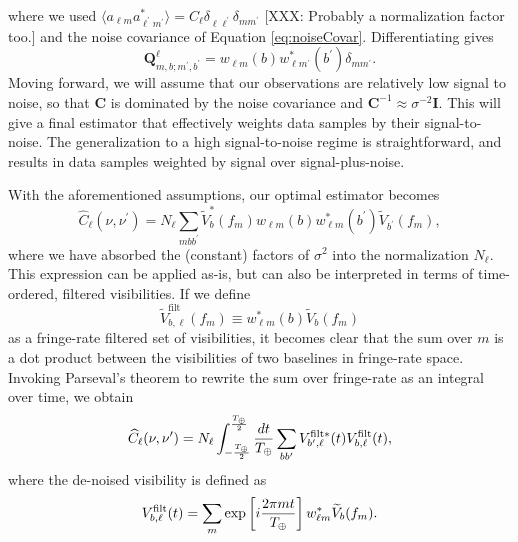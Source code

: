 \documentclass[twocolumn,apj,numberedappendix]{emulateapj}
\begin{document}
where we used $\langle a_{\ell m} a^*_{\ell^\prime m^\prime} \rangle = C_\ell \delta_{\ell \ell^\prime} \delta_{m m^\prime}$ [XXX: Probably a normalization factor too.] and the noise covariance of Equation \eqref{eq:noiseCovar}.  Differentiating gives
\begin{equation}
\mathbf{Q}^\ell_{m,b;m^\prime,b^\prime} =  w_{\ell m}(b) w^*_{\ell m^\prime }(b^\prime) \delta_{m m^\prime}.
\end{equation}
Moving forward, we will assume that our observations are relatively low signal to noise, so that $\mathbf{C}$ is dominated by the noise covariance and $\mathbf{C}^{-1} \approx \sigma^{-2} \mathbf{I}$.  This will give a final estimator that effectively weights data samples by their signal-to-noise.  The generalization to a high signal-to-noise regime is straightforward, and results in data samples weighted by signal over signal-plus-noise.

With the aforementioned assumptions, our optimal estimator becomes
\begin{equation}
\label{eq:mspaceEst}
\widehat{C}_\ell (\nu, \nu^\prime) = N_\ell \sum_{mbb^\prime} \widetilde{V}^*_b (f_m) w_{\ell m}(b) w^*_{\ell m}(b^\prime) \widetilde{V}_{b^\prime} (f_m),
\end{equation}
where we have absorbed the (constant) factors of $\sigma^2$ into the normalization $N_\ell$.  This expression can be applied as-is, but can also be interpreted in terms of time-ordered, filtered visibilities.  If we define
\begin{equation}
\widetilde{V}^\textrm{filt}_{b,\ell} (f_m) \equiv w^*_{\ell m}(b) \widetilde{V}_{b} (f_m)
\end{equation}
as a fringe-rate filtered set of visibilities, it becomes clear that the sum over $m$ is a dot product between the visibilities of two baselines in fringe-rate space.  Invoking Parseval's theorem to rewrite the sum over fringe-rate as an integral over time, we obtain
\begin{equation}
\widehat{C}_\ell (\nu, \nu^\prime) = N_\ell  \int_{-\frac{T_\Earth}{2}}^{\frac{T_\Earth}{2}} \frac{dt}{T_\Earth}  \sum_{bb^\prime} V^{\textrm{filt}*}_{b^\prime,\ell} (t) V^\textrm{filt}_{b,\ell} (t),
\end{equation}
where the de-noised visibility is defined as
\begin{equation}
V^\textrm{filt}_{b,\ell} (t)=  \sum_m \exp \left[i \frac{2 \pi m t}{T_\Earth}\right] w_{\ell m}^* \widetilde{V}_{b} (f_m).
\end{equation}
\end{document}
